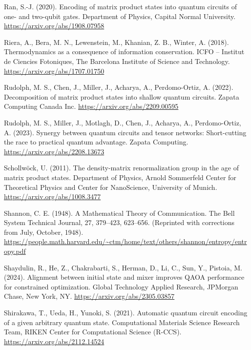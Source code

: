 \begin{thebibliography}{a}
Ran, S.-J. (2020). Encoding of matrix product states into quantum circuits of one- and two-qubit gates. Department of Physics, Capital Normal University.
\url{https://arxiv.org/abs/1908.07958}

Riera, A., Bera, M. N., Lewenstein, M., Khanian, Z. B., Winter, A. (2018). Thermodynamics as a consequence of information conservation. ICFO – Institut de Ciencies Fotoniques, The Barcelona Institute of Science and Technology.
\url{https://arxiv.org/abs/1707.01750}

Rudolph, M. S., Chen, J., Miller, J., Acharya, A.,  Perdomo-Ortiz, A. (2022). Decomposition of matrix product states into shallow quantum circuits. Zapata Computing Canada Inc.
\url{https://arxiv.org/abs/2209.00595}

Rudolph, M. S., Miller, J., Motlagh, D., Chen, J., Acharya, A., Perdomo-Ortiz, A. (2023). Synergy between quantum circuits and tensor networks: Short-cutting the race to practical quantum advantage. Zapata Computing.
\url{https://arxiv.org/abs/2208.13673}

Schollwöck, U. (2011). The density-matrix renormalization group in the age of matrix product states. Department of Physics, Arnold Sommerfeld Center for Theoretical Physics and Center for NanoScience, University of Munich.
\url{https://arxiv.org/abs/1008.3477}

Shannon, C. E. (1948). A Mathematical Theory of Communication. The Bell System Technical Journal, 27, 379–423, 623–656. (Reprinted with corrections from July, October, 1948).
\url{https://people.math.harvard.edu/~ctm/home/text/others/shannon/entropy/entropy.pdf}

Shaydulin, R., He, Z., Chakrabarti, S., Herman, D., Li, C., Sun, Y., Pistoia, M. (2024). Alignment between initial state and mixer improves QAOA performance for constrained optimization. Global Technology Applied Research, JPMorgan Chase, New York, NY.
\url{https://arxiv.org/abs/2305.03857}

Shirakawa, T., Ueda, H.,  Yunoki, S. (2021). Automatic quantum circuit encoding of a given arbitrary quantum state. Computational Materials Science Research Team, RIKEN Center for Computational Science (R-CCS).
\url{https://arxiv.org/abs/2112.14524}


\end{thebibliography}
